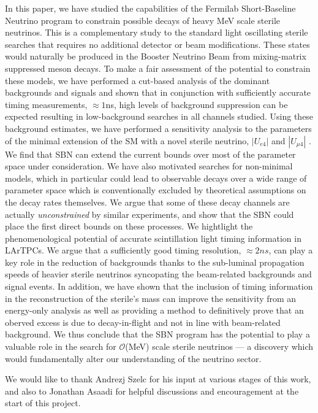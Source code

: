 \documentclass[11pt, a4paper]{article}
\begin{document}
In this paper, we have studied the capabilities of the Fermilab Short-Baseline
Neutrino program to constrain possible decays of heavy MeV scale sterile
neutrinos. This is a complementary study to the standard light oscillating
sterile searches that requires no additional detector or beam modifications.
These states would naturally be produced in the Booster Neutrino Beam from
mixing-matrix suppressed meson decays. To make a fair assessment of the
potential to constrain these models, we have performed a cut-based analysis of
the dominant backgrounds and signals and shown that in conjunction with
sufficiently accurate timing measurements, $\approx 1$ns, high levels of
background suppression can be expected resulting in low-background searches in
all channels studied. Using these background estimates, we have performed a
sensitivity analysis to the parameters of the minimal extension of the SM with
a novel sterile neutrino, $|U_{e4}|$ and $|U_{\mu4}|$ . 
%
We find that SBN can extend the current bounds over most of the parameter space
under consideration. 
%
We have also motivated searches for non-minimal models, which in particular
could lead to observable decays over a wide range of parameter space which is
conventionally excluded by theoretical assumptions on the decay rates
themselves. We argue that some of these decay channels are actually
\emph{unconstrained} by similar experiments, and show that the SBN could place
the first direct bounds on these processes.
%
We hightlight the phenomenological potential of accurate scintillation light timing information
in LArTPCs. We argue that a sufficiently good timing resolution, $\approx 2ns$, can play a key role in the reduction of
backgrounds thanks to the sub-luminal propagation speeds of heavier sterile
neutrinos syncopating the beam-related backgrounds and signal events. In
addition, we have shown that the inclusion of timing information in the
reconstruction of the sterile's mass can improve the sensitivity from an
energy-only analysis as well as providing a method to definitively prove that an oberved excess is due to decay-in-flight and not in line with beam-related background.
%
We thus conclude that the SBN program has the potential to play a valuable role in the
search for $\mathcal{O}$(MeV) scale sterile neutrinos --- a discovery which would
fundamentally alter our understanding of the neutrino sector.

\acknowledgments

We would like to thank Andrezj Szelc for his input at various stages of this
work, and also to Jonathan Asaadi for helpful discussions and encouragement at
the start of this project.
\end{document}
